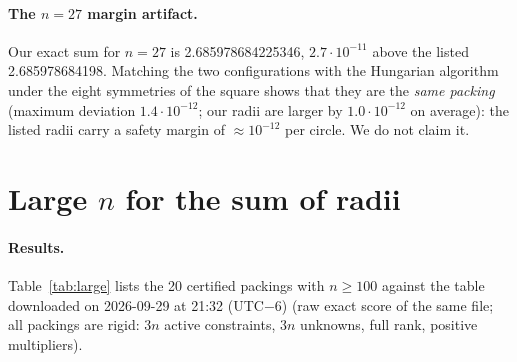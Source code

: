 \documentclass[10pt]{article}
\begin{document}
\paragraph{The $n=27$ margin artifact.} Our exact sum for $n=27$ is 2.685978684225346, $2.7\cdot10^{-11}$ above the listed 2.685978684198. Matching the two configurations with the Hungarian algorithm under the eight symmetries of the square shows that they are the \emph{same packing}
(maximum deviation $1.4\cdot10^{-12}$; our radii are larger by $1.0\cdot10^{-12}$ on average): the listed radii carry a safety margin of $\approx10^{-12}$ per circle. We do not claim it.

\section{Large $n$ for the sum of radii}\label{sec:large}
\paragraph{Results.} Table~\ref{tab:large} lists the 20 certified packings with $n\ge100$ against the table downloaded on 2026-09-29 at 21:32 (UTC$-6$) (raw exact score of the same file; all packings are rigid: $3n$ active constraints, $3n$ unknowns, full rank, positive multipliers).
\begin{table}[h]\centering
{\footnotesize}
\caption{Certified sum of radii vs.\ the local copy of the Packomania table (\texttt{results/large\_n\_summary.md}; checks are logged in \texttt{results/record\_check\_20260929\_213247.txt}). Positive gap $=$ ahead of the listed value at that time.}\label{tab:large}
\end{table}
\end{document}
